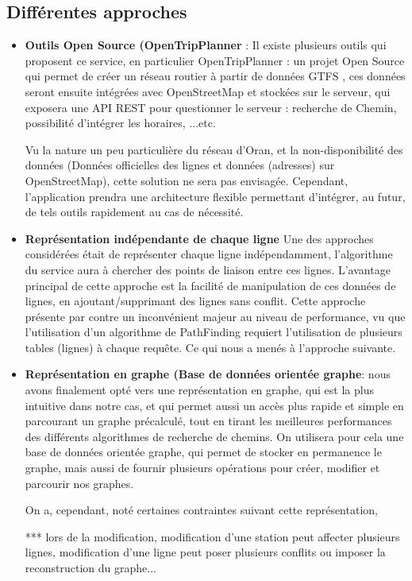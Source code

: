 \subsection{Différentes approches}
\begin{itemize}
	\item \textbf{Outils Open Source (OpenTripPlanner} : 
	      Il existe plusieurs outils qui proposent ce service, en particulier OpenTripPlanner : un projet Open Source qui permet de créer un réseau routier à partir de données GTFS , ces données seront ensuite intégrées avec OpenStreetMap et stockées sur le serveur, qui exposera une API REST pour questionner le serveur : recherche de Chemin, possibilité d'intégrer les horaires, ...etc.
	      		
	      Vu la nature un peu particulière du réseau d'Oran, et la non-disponibilité des données (Données officielles des lignes et données (adresses) sur OpenStreetMap), cette solution ne sera pas envisagée. 
	      Cependant, l'application prendra une architecture flexible permettant d'intégrer, au futur, de tels outils rapidement au cas de nécessité.
	\item \textbf{Représentation indépendante de chaque ligne}
	      Une des approches considérées était de représenter chaque ligne indépendamment, l'algorithme du service aura à chercher des points de liaison entre ces lignes.
	      L'avantage principal de cette approche est la facilité de manipulation de ces données de lignes, en ajoutant/supprimant des lignes sans conflit.
	      Cette approche présente par contre un inconvénient majeur au niveau de performance, vu que l'utilisation d'un algorithme de PathFinding requiert l'utilisation de plusieurs tables (lignes) à chaque requête. Ce qui nous a menés à l'approche suivante.
	\item \textbf{Représentation en graphe (Base de données orientée graphe}: nous avons finalement opté vers une représentation en graphe, qui est la plus intuitive dans notre cas, et qui permet aussi un accès plus rapide et simple en parcourant un graphe précalculé, tout en tirant les meilleures performances des différents algorithmes de recherche de chemins.
	On utilisera pour cela une base de données orientée graphe, qui permet de stocker en permanence le graphe, mais aussi de fournir plusieurs opérations pour créer, modifier et parcourir nos graphes.
	
	On a, cependant, noté certaines contraintes suivant cette représentation, 
	
	*** lors de la modification, modification d'une station peut affecter plusieurs lignes, modification d'une ligne peut poser plusieurs conflits ou imposer la reconstruction du graphe...
	     
\end{itemize}
